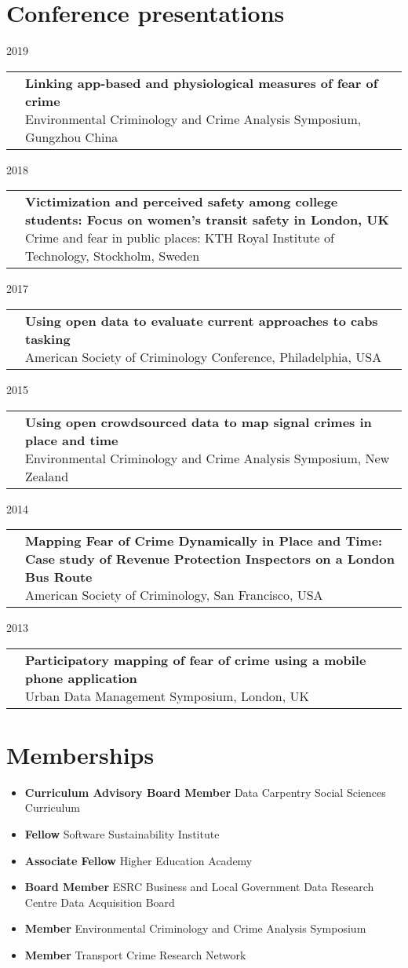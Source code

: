 \documentclass[10pt,a4paper,]{article}
\makeatletter
\providecommand{\tightlist}{%
  \setlength{\itemsep}{0pt}\setlength{\parskip}{0pt}}
\def\briefitem#1#2#3{
#2 & \parbox[t]{0.85\textwidth}{%
      \textbf{#1}\\[-0.1cm]{\footnotesize #3}}\\[0.4cm]}
\def\briefsection#1{\begin{longtable}{@{\extracolsep{\fill}}ll}#1\end{longtable}}
\makeatother
\begin{document}
\hypertarget{conference-presentations}{%
\section{Conference presentations}\label{conference-presentations}}

2019
\briefsection{\briefitem{Linking app-based and physiological measures of fear of crime}{}{Environmental Criminology and Crime Analysis Symposium, Gungzhou China}\briefitem{Mapping Sexual Harassment in Public Places: Open Source Data Driven Contextual Analysis}{}{Environmental Criminology and Crime Analysis Symposium, Gungzhou China}}

2018
\briefsection{\briefitem{Victimization and perceived safety among college students: Focus on women's transit safety in London, UK}{}{Crime and fear in public places: KTH Royal Institute of Technology, Stockholm, Sweden}\briefitem{Measuring fear of crime through app-based and sensing methodologies}{}{Crime and fear in public places: KTH Royal Institute of Technology, Stockholm, Sweden}}

2017
\briefsection{\briefitem{Using open data to evaluate current approaches to cabs tasking}{}{American Society of Criminology Conference, Philadelphia, USA}\briefitem{Using open data to evaluate current approaches to cabs tasking}{}{Environmental Criminology and Crime Analysis Symposium, El Salvador}\briefitem{Active Participant}{}{R Open Science Unconference, Los Angeles, USA}}

2015
\briefsection{\briefitem{Using open crowdsourced data to map signal crimes in place and time}{}{Environmental Criminology and Crime Analysis Symposium, New Zealand}\briefitem{Alternative Denominators in Transport Crime Rate}{}{Stockholm Symposium for Criminology, Sweden}}

2014
\briefsection{\briefitem{Mapping Fear of Crime Dynamically in Place and Time: Case study of Revenue Protection Inspectors on a London Bus Route}{}{American Society of Criminology, San Francisco, USA}}

2013
\briefsection{\briefitem{Participatory mapping of fear of crime using a mobile phone application}{}{Urban Data Management Symposium, London, UK}}

\hypertarget{memberships}{%
\section{Memberships}\label{memberships}}

\begin{itemize}
\tightlist
\item
  \textbf{Curriculum Advisory Board Member} Data Carpentry Social Sciences Curriculum
\item
  \textbf{Fellow} Software Sustainability Institute
\item
  \textbf{Associate Fellow} Higher Education Academy
\item
  \textbf{Board Member} ESRC Business and Local Government Data Research Centre Data Acquisition Board
\item
  \textbf{Member} Environmental Criminology and Crime Analysis Symposium
\item
  \textbf{Member} Transport Crime Research Network
\end{itemize}
\end{document}
